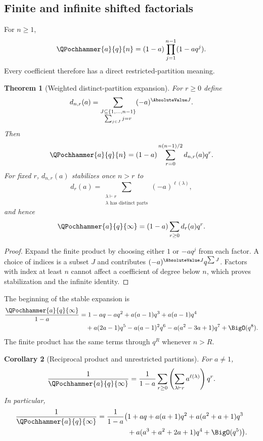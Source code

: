 \documentclass[11pt,oneside]{article}
\newtheorem{theorem}{Theorem}[section]
\newtheorem{corollary}[theorem]{Corollary}
\theoremstyle{definition}
\theoremstyle{remark}
\let\reportsubsection\subsection
\let\section\reportsubsection
\begin{document}
\section{Finite and infinite shifted factorials}

For $n\ge1$,
\[
 \QPochhammer{a}{q}{n}=(1-a)\prod_{j=1}^{n-1}(1-aq^j).
\]
Every coefficient therefore has a direct restricted-partition meaning.

\begin{theorem}[Weighted distinct-partition expansion]\label{thm:qzero-poc}
For $r\ge0$ define
\[
 d_{n,r}(a)=
 \sum_{\substack{J\subseteq\{1,\ldots,n-1\}\\\sum_{j\in J}j=r}}
 (-a)^{\AbsoluteValue J}.
\]
Then
\begin{equation}\label{eq:qzero-poc-exact}
 \QPochhammer{a}{q}{n}=(1-a)\sum_{r=0}^{n(n-1)/2}d_{n,r}(a)q^r.
\end{equation}
For fixed $r$, $d_{n,r}(a)$ stabilizes once $n>r$ to
\[
 d_r(a)=\sum_{\substack{\lambda\vdash r\\\lambda\text{ has distinct parts}}}
 (-a)^{\ell(\lambda)},
\]
and hence
\begin{equation}\label{eq:qzero-poc-infinite}
 \QPochhammer{a}{q}{\infty}=(1-a)\sum_{r\ge0}d_r(a)q^r.
\end{equation}
\end{theorem}

\begin{proof}
Expand the finite product by choosing either $1$ or $-aq^j$ from each
factor.  A choice of indices is a subset $J$ and contributes
$(-a)^{\AbsoluteValue J}q^{\sum J}$.  Factors with index at least $n$ cannot affect a
coefficient of degree below $n$, which proves stabilization and the infinite
identity.
\end{proof}

The beginning of the stable expansion is
\begin{align}
 \frac{\QPochhammer{a}{q}{\infty}}{1-a}
 &=1-aq-aq^2+a(a-1)q^3+a(a-1)q^4
 \notag\\
 &\quad+a(2a-1)q^5-a(a-1)^2q^6
 -a(a^2-3a+1)q^7+\BigO(q^8).
 \label{eq:qzero-poc-first}
\end{align}
The finite product has the same terms through $q^R$ whenever $n>R$.

\begin{corollary}[Reciprocal product and unrestricted partitions]
For $a\ne1$,
\begin{equation}\label{eq:qzero-reciprocal-poc}
 \frac1{\QPochhammer{a}{q}{\infty}}
 =\frac1{1-a}\sum_{r\ge0}
 \left(\sum_{\lambda\vdash r}a^{\ell(\lambda)}\right)q^r.
\end{equation}
In particular,
\begin{align*}
 \frac1{\QPochhammer{a}{q}{\infty}}
 =\frac1{1-a}\bigl(&1+aq+a(a+1)q^2
 +a(a^2+a+1)q^3\\
 &+a(a^3+a^2+2a+1)q^4+\BigO(q^5)\bigr).
\end{align*}
\end{corollary}
\end{document}

